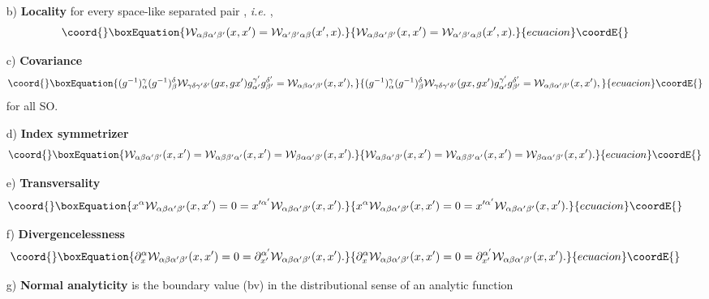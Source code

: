 \documentclass[a4paper,11pt,showpacs,preprintnumbers]{revtex4}
\begin{document}
\begin{enumerate}
\item[b)] {\bf Locality}
for every space-like separated pair \coordHE{}, {\it i.e.} \coordHE{},
\begin{equation}\coord{}\boxEquation{
{\cal W}_{\alpha\beta \alpha'\beta'}(x,x')={\cal
W}_{\alpha'\beta'\alpha\beta }(x',x) .
}{
{\cal W}_{\alpha\beta \alpha'\beta'}(x,x')={\cal
W}_{\alpha'\beta'\alpha\beta }(x',x) .
}{ecuacion}\coordE{}\end{equation}
\item[c)] {\bf Covariance}
\begin{equation}\coord{}\boxEquation{
(g^{-1})^{\gamma}_{\alpha}(g^{-1})^{\delta}_{\beta} {\cal
W}_{\gamma\delta \gamma'\delta'} (g x,g x')g^{\gamma'}_{\alpha'}
g^{\delta'}_{\beta'}= {\cal W}_{\alpha\beta \alpha'\beta'}(x,x'),
}{
(g^{-1})^{\gamma}_{\alpha}(g^{-1})^{\delta}_{\beta} {\cal
W}_{\gamma\delta \gamma'\delta'} (g x,g x')g^{\gamma'}_{\alpha'}
g^{\delta'}_{\beta'}= {\cal W}_{\alpha\beta \alpha'\beta'}(x,x'),
}{ecuacion}\coordE{}\end{equation}
for all \coordHE{} SO\coordHE{}.
\item[d)] {\bf Index symmetrizer}
\begin{equation}\coord{}\boxEquation{
{\cal W}_{\alpha\beta \alpha'\beta'}(x,x')={\cal W}_{\alpha\beta
\beta'\alpha '}(x,x')={\cal W}_{\beta\alpha\alpha'\beta'}(x,x').
}{
{\cal W}_{\alpha\beta \alpha'\beta'}(x,x')={\cal W}_{\alpha\beta
\beta'\alpha '}(x,x')={\cal W}_{\beta\alpha\alpha'\beta'}(x,x').
}{ecuacion}\coordE{}\end{equation}
\item[e)] {\bf Transversality}
\begin{equation}\coord{}\boxEquation{
x^\alpha {\cal W}_{\alpha\beta \alpha'\beta'}(x,x')=0=x'^{\alpha'}
{\cal W}_{\alpha\beta\alpha'\beta'}(x,x') .
}{
x^\alpha {\cal W}_{\alpha\beta \alpha'\beta'}(x,x')=0=x'^{\alpha'}
{\cal W}_{\alpha\beta\alpha'\beta'}(x,x') .
}{ecuacion}\coordE{}\end{equation}
\item[f)] {\bf Divergencelessness}
\begin{equation}\coord{}\boxEquation{ \partial_x^\alpha {\cal
W}_{\alpha\beta
\alpha'\beta'}(x,x')=0=\partial_{x'}^{\alpha'}
{\cal W}_{\alpha\beta \alpha'\beta'}(x,x').
}{ \partial_x^\alpha {\cal
W}_{\alpha\beta
\alpha'\beta'}(x,x')=0=\partial_{x'}^{\alpha'}
{\cal W}_{\alpha\beta \alpha'\beta'}(x,x').
}{ecuacion}\coordE{}\end{equation}
\item[g)] {\bf Normal analyticity}
\coordHE{} is the boundary value
(bv) in the distributional sense of an analytic function
\coordHE{}
\end{enumerate}
\end{document}
